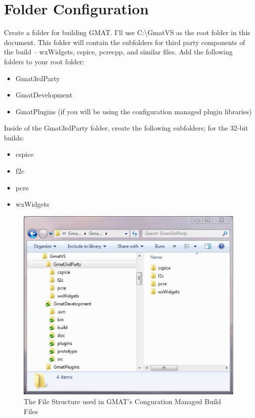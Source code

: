 \documentclass[letterpaper,10pt]{article}%
\begin{document}
\section{Folder Configuration}

Create a folder for building GMAT.  I'll use C:\textbackslash GmatVS as the root folder in this document.  This folder will contain the subfolders for third party components of the build -- wxWidgets, cspice, pcrecpp, and similar files.  Add the following folders to your root folder:
\begin{itemize}
\item Gmat3rdParty
\item GmatDevelopment
\item GmatPlugins (if you will be using the configuration managed plugin libraries)
\end{itemize}

\noindent Inside of the Gmat3rdParty folder, create the following subfolders; for the 32-bit builds:
\begin{itemize}
\item cspice
\item f2c
\item pcre
\item wxWidgets
\end{itemize}

\begin{figure}
\centering
\includegraphics[scale=0.75]{FolderStructure.eps}
\caption{The File Structure used in GMAT's Conguration Managed Build Files}
\label{fig:FolderStructure}
\end{figure}
\end{document}

